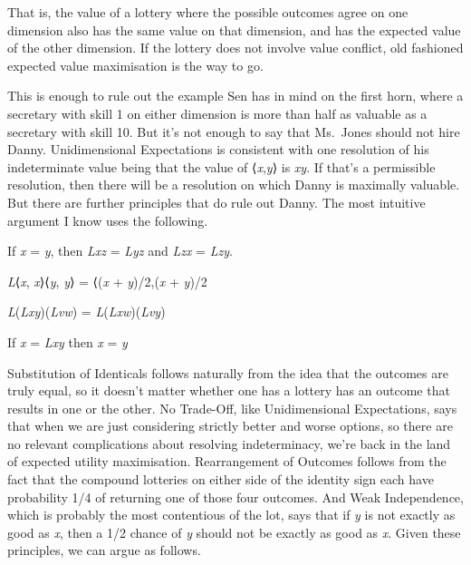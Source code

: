 \documentclass[
  11pt,
  letterpaper,
  DIV=11,
  numbers=noendperiod,
  twoside]{scrartcl}
\providecommand{\tightlist}{%
  \setlength{\itemsep}{0pt}\setlength{\parskip}{0pt}}
\begin{document}
That is, the value of a lottery where the possible outcomes agree on one
dimension also has the same value on that dimension, and has the
expected value of the other dimension. If the lottery does not involve
value conflict, old fashioned expected value maximisation is the way to
go.

This is enough to rule out the example Sen has in mind on the first
horn, where a secretary with skill 1 on either dimension is more than
half as valuable as a secretary with skill 10. But it's not enough to
say that Ms.~Jones should not hire Danny. Unidimensional Expectations is
consistent with one resolution of his indeterminate value being that the
value of ⟨\emph{x},\emph{y}⟩ is \emph{xy}. If that's a permissible
resolution, then there will be a resolution on which Danny is maximally
valuable. But there are further principles that do rule out Danny. The
most intuitive argument I know uses the following.

\begin{description}
\tightlist
\item[Substitution of Identicals (SI)]
If \emph{x} = \emph{y}, then \emph{Lxz} = \emph{Lyz} and \emph{Lzx} =
\emph{Lzy}.
\item[No Trade-Off (NT)]
\emph{L}⟨\emph{x}, \emph{x}⟩⟨\emph{y}, \emph{y}⟩ = ⟨(\emph{x} +
\emph{y})/2,(\emph{x} + \emph{y})/2
\item[Rearrangement of Outcomes (RO)]
\emph{L}(\emph{Lxy})(\emph{Lvw}) = \emph{L}(\emph{Lxw})(\emph{Lvy})
\item[Weak Independence (WI)]
If \emph{x} = \emph{Lxy} then \emph{x} = \emph{y}
\end{description}

Substitution of Identicals follows naturally from the idea that the
outcomes are truly equal, so it doesn't matter whether one has a lottery
has an outcome that results in one or the other. No Trade-Off, like
Unidimensional Expectations, says that when we are just considering
strictly better and worse options, so there are no relevant
complications about resolving indeterminacy, we're back in the land of
expected utility maximisation. Rearrangement of Outcomes follows from
the fact that the compound lotteries on either side of the identity sign
each have probability 1/4 of returning one of those four outcomes. And
Weak Independence, which is probably the most contentious of the lot,
says that if \emph{y} is not exactly as good as \emph{x}, then a 1/2
chance of \emph{y} should not be exactly as good as \emph{x}. Given
these principles, we can argue as follows.
\end{document}

